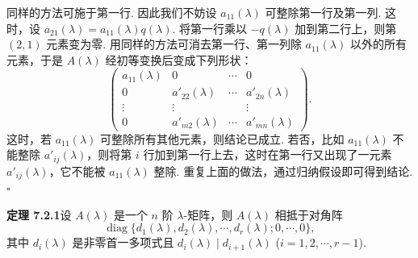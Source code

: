 \documentclass[UTF8, 12pt, fontset=fandol, oneside]{ctexart}
\begin{document}
同样的方法可施于第一行. 因此我们不妨设 $a_{11}(\lambda)$ 可整除第一行及第一列. 这时，设 $a_{21}(\lambda)=a_{11}(\lambda)q(\lambda)$. 将第一行乘以 $-q(\lambda)$ 加到第二行上，则第 $(2,1)$ 元素变为零. 用同样的方法可消去第一行、第一列除 $a_{11}(\lambda)$ 以外的所有元素，于是 $A(\lambda)$ 经初等变换后变成下列形状：
\begin{equation}
\left(\begin{array}{cccc}
a_{11}(\lambda) & 0 & \cdots & 0\\
0 & a'_{22}(\lambda) & \cdots & a'_{2n}(\lambda)\\
\vdots & \vdots & & \vdots\\
0 & a'_{m2}(\lambda) & \cdots & a'_{mn}(\lambda)
\end{array}\right).
\tag{7.2.1}
\end{equation}
这时，若 $a_{11}(\lambda)$ 可整除所有其他元素，则结论已成立. 若否，比如 $a_{11}(\lambda)$ 不能整除 $a'_{ij}(\lambda)$，则将第 $i$ 行加到第一行上去，这时在第一行又出现了一元素 $a'_{ij}(\lambda)$，它不能被 $a_{11}(\lambda)$ 整除. 重复上面的做法，通过归纳假设即可得到结论. $\square$

\noindent\textbf{定理 7.2.1}\quad 设 $A(\lambda)$ 是一个 $n$ 阶 $\lambda$-矩阵，则 $A(\lambda)$ 相抵于对角阵
\begin{equation}
\operatorname{diag}\{d_1(\lambda),d_2(\lambda),\cdots,d_r(\lambda);0,\cdots,0\},
\tag{7.2.2}
\end{equation}
其中 $d_i(\lambda)$ 是非零首一多项式且 $d_i(\lambda)\mid d_{i+1}(\lambda)$ ($i=1,2,\cdots,r-1$).
\end{document}
